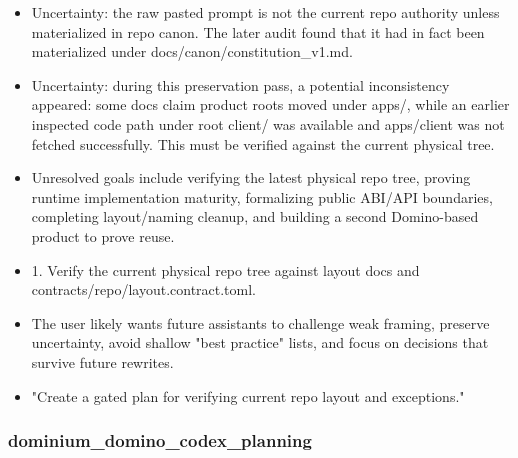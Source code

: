 \documentclass[11pt,a4paper]{report}
\begin{document}
\begin{itemize}
\item Uncertainty: the raw pasted prompt is not the current repo authority unless materialized in repo canon. The later audit found that it had in fact been materialized under docs/canon/constitution\_v1.md.
\item Uncertainty: during this preservation pass, a potential inconsistency appeared: some docs claim product roots moved under apps/, while an earlier inspected code path under root client/ was available and apps/client was not fetched successfully. This must be verified against the current physical tree.
\item Unresolved goals include verifying the latest physical repo tree, proving runtime implementation maturity, formalizing public ABI/API boundaries, completing layout/naming cleanup, and building a second Domino-based product to prove reuse.
\item 1. Verify the current physical repo tree against layout docs and contracts/repo/layout.contract.toml.
\item The user likely wants future assistants to challenge weak framing, preserve uncertainty, avoid shallow "best practice" lists, and focus on decisions that survive future rewrites.
\item "Create a gated plan for verifying current repo layout and exceptions."
\end{itemize}

\subsubsection{dominium\_domino\_codex\_planning}
\end{document}
